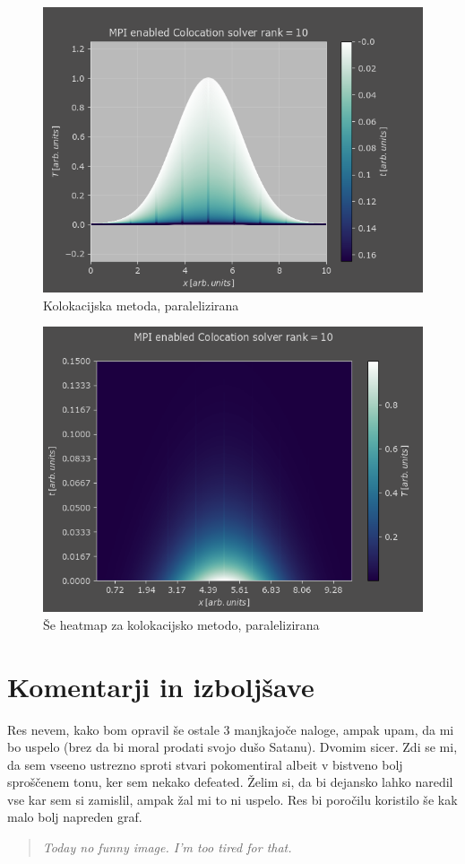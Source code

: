 \documentclass[a4paper]{article}
\begin{document}
\begin{figure}[H]
    \centering
        \includegraphics[width=\linewidth]{./images/C_MPI_solved_manual.png}
        \caption{Kolokacijska metoda, paralelizirana}
\label{fig:15}
\end{figure}

\begin{figure}[H]
    \centering
        \includegraphics[width=\linewidth]{./images/C_MPI_solved_manual_Heatmap.png}
        \caption{Še heatmap za kolokacijsko metodo, paralelizirana}
\label{fig:16}
\end{figure}


\section{Komentarji in izboljšave}
Res nevem, kako bom opravil še ostale 3 manjkajoče naloge, ampak upam, da mi bo uspelo (brez da 
bi moral prodati svojo dušo Satanu). Dvomim sicer. Zdi se mi, da sem vseeno ustrezno sproti stvari 
pokomentiral albeit v bistveno bolj sproščenem tonu, ker sem nekako defeated. Želim si, da bi dejansko
lahko naredil vse kar sem si zamislil, ampak žal mi to ni uspelo. Res bi poročilu koristilo še kak 
malo bolj napreden graf.

\begin{quotation}
    \centering
    \textit{Today no funny image. I'm too tired for that.}
\end{quotation}


\newpage


\end{document}

